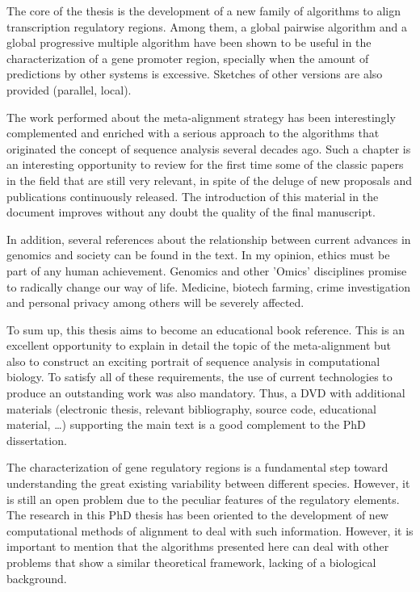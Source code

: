 The core of the thesis is the development of a new family of algorithms to align transcription regulatory 
regions. Among them, a global pairwise algorithm and a global progressive multiple algorithm have been 
shown to be useful in the characterization of a gene promoter region, specially when the amount of 
predictions by other systems is excessive. Sketches of other versions are also provided (parallel, local).

The work performed about the meta-alignment strategy has been interestingly complemented and enriched
with a serious approach to the algorithms that originated the concept of sequence analysis several decades
ago. Such a chapter is an interesting opportunity to review for the first time some of the classic papers 
in the field that are still very relevant, in spite of the deluge of new proposals and publications 
continuously released. The introduction of this material in the document improves without any doubt the 
quality of the final manuscript.

In addition, several references about the relationship between current advances in genomics and society 
can be found in the text. In my opinion, ethics must be part of any human achievement. Genomics and other 
'Omics' disciplines promise to radically change our way of life. Medicine, biotech farming, crime 
investigation and personal privacy among others will be severely affected.

To sum up, this thesis aims to become an educational book reference. This is an excellent opportunity to 
explain in detail the topic of the meta-alignment but also to construct an exciting portrait of sequence 
analysis in computational biology. To satisfy all of these requirements, the use of current technologies 
to produce an outstanding work was also mandatory. Thus, a DVD with additional materials (electronic 
thesis, relevant bibliography, source code, educational material, \ldots) supporting the main text is a
good complement to the PhD dissertation.


% 

The characterization of gene regulatory regions is a fundamental step toward understanding the
great existing variability between different species. However, it is still an open problem
due to the peculiar features of the regulatory elements. The research in this PhD thesis has
been oriented to the development of new computational methods of alignment to deal with such 
information. However, it is important to mention that the algorithms presented here can deal 
with other problems that show a similar theoretical framework, lacking of a biological background.

